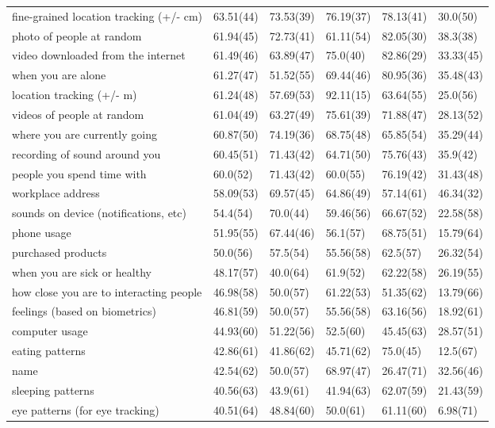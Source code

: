 \documentclass[a4paper,12pt]{article}
\begin{document}
\begin{longtable}{| p{7cm} | l | l | l | l | l |}
fine-grained location tracking (+/-  cm) & 63.51(44) & 73.53(39) & 76.19(37) & 78.13(41) & 30.0(50) \\ 
photo of people at random & 61.94(45) & 72.73(41) & 61.11(54) & 82.05(30) & 38.3(38) \\ 
video downloaded from the internet & 61.49(46) & 63.89(47) & 75.0(40) & 82.86(29) & 33.33(45) \\ 
when you are alone & 61.27(47) & 51.52(55) & 69.44(46) & 80.95(36) & 35.48(43) \\ 
location tracking (+/- m) & 61.24(48) & 57.69(53) & 92.11(15) & 63.64(55) & 25.0(56) \\ 
videos of people at random & 61.04(49) & 63.27(49) & 75.61(39) & 71.88(47) & 28.13(52) \\ 
where you are currently going & 60.87(50) & 74.19(36) & 68.75(48) & 65.85(54) & 35.29(44) \\ 
recording of sound around you & 60.45(51) & 71.43(42) & 64.71(50) & 75.76(43) & 35.9(42) \\ 
people you spend time with & 60.0(52) & 71.43(42) & 60.0(55) & 76.19(42) & 31.43(48) \\ 
workplace address & 58.09(53) & 69.57(45) & 64.86(49) & 57.14(61) & 46.34(32) \\ 
sounds on device (notifications, etc) & 54.4(54) & 70.0(44) & 59.46(56) & 66.67(52) & 22.58(58) \\ 
phone usage & 51.95(55) & 67.44(46) & 56.1(57) & 68.75(51) & 15.79(64) \\ 
purchased products & 50.0(56) & 57.5(54) & 55.56(58) & 62.5(57) & 26.32(54) \\ 
when you are sick or healthy & 48.17(57) & 40.0(64) & 61.9(52) & 62.22(58) & 26.19(55) \\ 
how close you are to interacting people & 46.98(58) & 50.0(57) & 61.22(53) & 51.35(62) & 13.79(66) \\ 
feelings (based on biometrics) & 46.81(59) & 50.0(57) & 55.56(58) & 63.16(56) & 18.92(61) \\ 
computer usage& 44.93(60) & 51.22(56) & 52.5(60) & 45.45(63) & 28.57(51) \\ 
eating patterns & 42.86(61) & 41.86(62) & 45.71(62) & 75.0(45) & 12.5(67) \\ 
name & 42.54(62) & 50.0(57) & 68.97(47) & 26.47(71) & 32.56(46) \\ 
sleeping patterns & 40.56(63) & 43.9(61) & 41.94(63) & 62.07(59) & 21.43(59) \\ 
eye patterns (for eye tracking) & 40.51(64) & 48.84(60) & 50.0(61) & 61.11(60) & 6.98(71) \\ 

\end{longtable}
\end{document}

